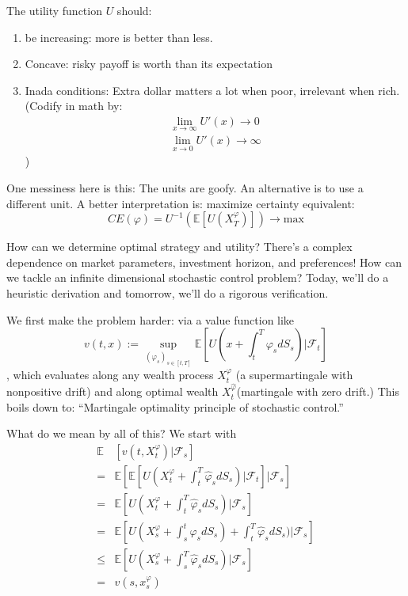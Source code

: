 \documentclass[twocolumn,openany]{book}
\begin{document}
The utility function $U$ should:
\begin{enumerate}
	\item be increasing: more is better than less.
	\item Concave: risky payoff is worth than its expectation
	\item Inada conditions: Extra dollar matters a lot when poor, irrelevant when rich. (Codify in math by:
	\begin{align}
		\lim_{x\to \infty} U'(x) \to 0\\
		\lim_{x\to 0} U'(x) \to \infty
	\end{align})
\end{enumerate}

One messiness here is this: The units are goofy. An alternative is to use a different unit.
A better interpretation is: maximize certainty equivalent:
\begin{equation}
	CE(\varphi) = U^{-1}(\mathbb{E}\left[ U(X_T^\varphi) \right]) \to \text{max}
\end{equation}

How can we determine optimal strategy and utility? There's a complex dependence on market parameters, investment horizon, and preferences! How can we tackle an infinite dimensional stochastic control problem? Today, we'll do a heuristic derivation and tomorrow, we'll do a rigorous verification.

We first make the problem harder: via a value function like
\begin{equation}
	v(t,x) := \sup_{(\varphi_s)_{s\in[t,T]}} \mathbb{E}\left[ U(x + \int_t^T \varphi_s dS_s) | \mathcal{F}_t\right]
\end{equation}, which evaluates along any wealth process $X_t^\varphi$ (a supermartingale with nonpositive drift) and along optimal wealth $X_t^{\hat{\varphi}}$(martingale with zero drift.) This boils down to: ``Martingale optimality principle of stochastic control.'' 

What do we mean by all of this? We start with
\begin{align}
	\mathbb{E}& \left[ v(t,X_t^\varphi) | \mathcal{F}_s \right] \\
	 =& \mathbb{E} \left[ \mathbb{E}\left[ U(X^\varphi_t + \int_t^T \hat{\varphi}_s dS_s) | \mathcal{F}_t\right] | \mathcal{F}_s \right] \\
	=& \mathbb{E} \left[ U(X^\varphi_t + \int_t^T \hat{\varphi}_s dS_s) | \mathcal{F}_s \right] \\
	=& \mathbb{E} \left[ U(X^\varphi_s + \int_s^t \hat{\varphi}_s dS_s)+ \int_t^T \hat{\varphi}_s dS_s) | \mathcal{F}_s \right] \\
	\leq& \mathbb{E} \left[ U(X^\varphi_s + \int_s^T \hat{\varphi}_s dS_s) | \mathcal{F}_s \right] \\
	=& v(s,x_s^\varphi)
\end{align}
\end{document}

